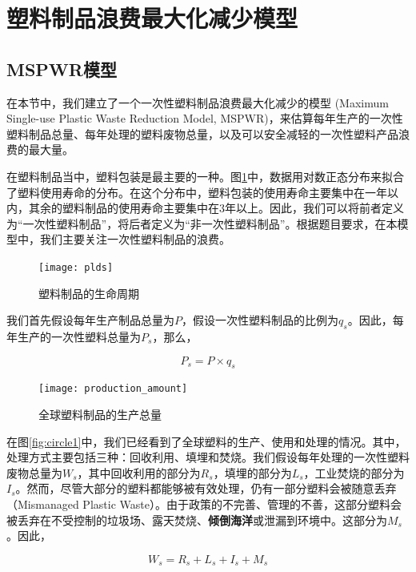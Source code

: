 \documentclass[UTF8, fontset=windows]{mcmthesis}
\begin{document}
\section{塑料制品浪费最大化减少模型}

\subsection{MSPWR模型}

在本节中，我们建立了一个一次性塑料制品浪费最大化减少的模型 (Maximum Single-use Plastic Waste Reduction Model, MSPWR)，来估算每年生产的一次性塑料制品总量、每年处理的塑料废物总量，以及可以安全减轻的一次性塑料产品浪费的最大量。

在塑料制品当中，塑料包装是最主要的一种。图\ref{fig:pld}中，数据\cite{geyer2017production}用对数正态分布来拟合了塑料使用寿命的分布。在这个分布中，塑料包装的使用寿命主要集中在一年以内，其余的塑料制品的使用寿命主要集中在3年以上。因此，我们可以将前者定义为“一次性塑料制品”，将后者定义为“非一次性塑料制品”。根据题目要求，在本模型中，我们主要关注一次性塑料制品的浪费。

\begin{figure}[h]
\centering
\texttt{[image: plds]}
\caption{塑料制品的生命周期}
\label{fig:pld}
\end{figure}

我们首先假设每年生产制品总量为$P$，假设一次性塑料制品的比例为$q_s$。因此，每年生产的一次性塑料总量为$P_s$，那么，

\begin{equation}
P_s = P \times q_s
\end{equation}

\begin{figure}[h]
\centering
\texttt{[image: production\_amount]}
\caption{全球塑料制品的生产总量}
\label{fig:production_amount}
\end{figure}

在图\ref{fig:circle1}中，我们已经看到了全球塑料的生产、使用和处理的情况。其中，处理方式主要包括三种：回收利用、填埋和焚烧。我们假设每年处理的一次性塑料废物总量为$W_s$，其中回收利用的部分为$R_s$，填埋的部分为$L_s$，工业焚烧的部分为$I_s$。然而，尽管大部分的塑料都能够被有效处理，仍有一部分塑料会被随意丢弃（Mismanaged Plastic Waste）。由于政策的不完善、管理的不善，这部分塑料会被丢弃在不受控制的垃圾场、露天焚烧、\textbf{倾倒海洋}或泄漏到环境中。这部分为$M_s$。因此，

\begin{equation}
W_s = R_s + L_s + I_s + M_s
\end{equation}
\end{document}
